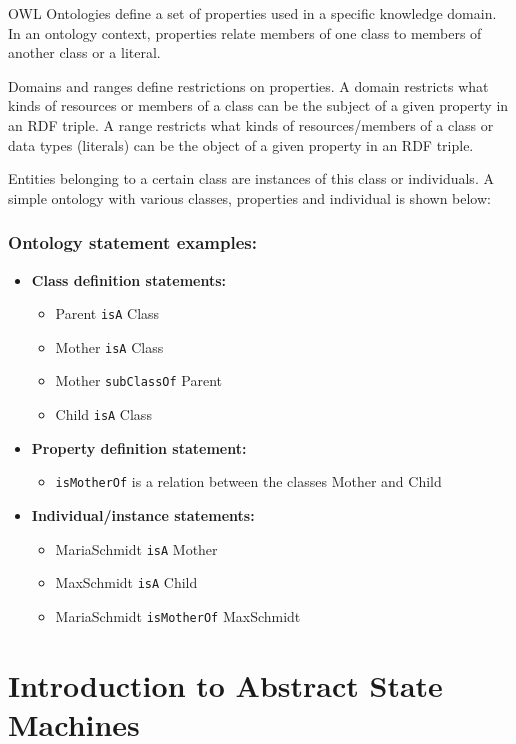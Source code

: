 OWL Ontologies define a set of properties used in a specific knowledge domain. In an ontology context, properties relate members of one class to members of another class or a literal.

Domains and ranges define restrictions on properties. A domain restricts what kinds of resources or members of a class can be the subject of a given property in an RDF triple. A range restricts what kinds of resources/members of a class or data types (literals) can be the object of a given property in an RDF triple.

Entities belonging to a certain class are instances of this class or individuals. A simple ontology with various classes, properties and individual is shown below:

\subsubsection{Ontology statement examples:}

\begin{itemize}
	\item \textbf {Class definition statements:}
	\begin{itemize}
		\item Parent \texttt{isA} Class
		\item Mother \texttt{isA} Class
		\item Mother \texttt{subClassOf} Parent
		\item Child \texttt{isA} Class
	\end{itemize}
	\item \textbf {Property definition statement:}
	\begin{itemize}
		\item \texttt{isMotherOf} is a relation between the classes Mother and Child
	\end{itemize}
	\item \textbf{Individual/instance statements:}
	\begin{itemize}
		\item MariaSchmidt \texttt{isA} Mother
		\item MaxSchmidt \texttt{isA} Child
		\item MariaSchmidt \texttt{isMotherOf} MaxSchmidt
	\end{itemize}
\end{itemize}

\section{Introduction to Abstract State Machines}
\label{sec:introASM}

